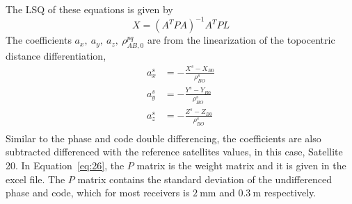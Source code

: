 The LSQ of these equations is given by
\begin{equation}
	X = (A^T P A)^{-1} A^T P L
	\label{eq:26}
\end{equation} %
The coefficients $a_x,~a_y,~a_z,~\rho^{pq}_{AB,0}$ are from the linearization of the topocentric distance differentiation,
\begin{align}
	a_x^s &= -\frac{X^s-X_{B0}}{\rho_{BO}^s}
	\label{eq:12a} \\
	a_y^s &= -\frac{Y^s-Y_{B0}}{\rho_{BO}^s}
	\label{eq:12b} \\
	a_z^s &= -\frac{Z^s-Z_{B0}}{\rho_{BO}^s}
	\label{eq:12c} \\
\end{align}
Similar to the phase and code double differencing, the coefficients are also subtracted differenced with the reference satellites values, in this case, Satellite 20.  In Equation~\eqref{eq:26}, the $P$ matrix is the weight matrix and it is given in the excel file.  The $P$ matrix contains the standard deviation of the undifferenced phase and code, which for most receivers is $2~\text{mm}$ and $0.3~\text{m}$ respectively.  
% 
% 
% 
% 
% 
% 
% 
